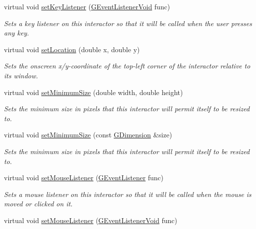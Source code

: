 \begin{DoxyCompactItemize}
virtual void \mbox{\hyperlink{classsgl_1_1GInteractor_ae48ecea73606c7bd9423e1c7cc589cc9}{set\+Key\+Listener}} (\mbox{\hyperlink{namespacesgl_a54427ce97bb1c2804e4fe2b0a62e8b17}{G\+Event\+Listener\+Void}} func)
\begin{DoxyCompactList}\small\item\em Sets a key listener on this interactor so that it will be called when the user presses any key. \end{DoxyCompactList}\item 
virtual void \mbox{\hyperlink{classsgl_1_1GInteractor_a04594e8ba9b98513a64f1da00dcae18c}{set\+Location}} (double x, double y)
\begin{DoxyCompactList}\small\item\em Sets the onscreen x/y-\/coordinate of the top-\/left corner of the interactor relative to its window. \end{DoxyCompactList}\item 
virtual void \mbox{\hyperlink{classsgl_1_1GInteractor_a0cf428e207b7f22cc08138a90b1b87b2}{set\+Minimum\+Size}} (double width, double height)
\begin{DoxyCompactList}\small\item\em Sets the minimum size in pixels that this interactor will permit itself to be resized to. \end{DoxyCompactList}\item 
virtual void \mbox{\hyperlink{classsgl_1_1GInteractor_a3b1046117ac6cb7abe467e00ba8a81f4}{set\+Minimum\+Size}} (const \mbox{\hyperlink{structsgl_1_1GDimension}{G\+Dimension}} \&size)
\begin{DoxyCompactList}\small\item\em Sets the minimum size in pixels that this interactor will permit itself to be resized to. \end{DoxyCompactList}\item 
virtual void \mbox{\hyperlink{classsgl_1_1GInteractor_a37d8dbc943f59920f705b0104f60bde2}{set\+Mouse\+Listener}} (\mbox{\hyperlink{namespacesgl_ae9f3e9eab70035da1a2b114e21357b25}{G\+Event\+Listener}} func)
\begin{DoxyCompactList}\small\item\em Sets a mouse listener on this interactor so that it will be called when the mouse is moved or clicked on it. \end{DoxyCompactList}\item 
virtual void \mbox{\hyperlink{classsgl_1_1GInteractor_aea7f647ea62d59f71b5fad6aa65eeaf9}{set\+Mouse\+Listener}} (\mbox{\hyperlink{namespacesgl_a54427ce97bb1c2804e4fe2b0a62e8b17}{G\+Event\+Listener\+Void}} func)

\end{DoxyCompactItemize}
